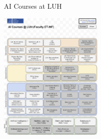 \documentclass[aspectratio=169]{../latex_main/tntbeamer}  %
\begin{document}
\begin{frame}{AI Courses at LUH}
    
    \centering
    \vspace{-2em}
    \includegraphics[width=0.38\textwidth]{images/aicources22.png}

\end{frame}
\end{document}
